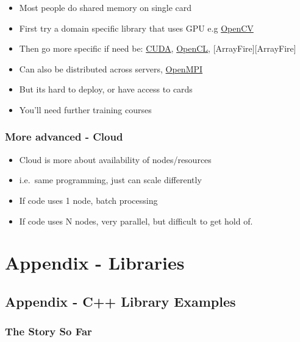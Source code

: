 \begin{itemize}
\itemsep1pt\parskip0pt
\item
  Most people do shared memory on single card
\item
  First try a domain specific library that uses GPU e.g
  \href{https://opencv.org/}{OpenCV}
\item
  Then go more specific if need be:
  \href{https://www.nvidia.com/object/cuda_home_temp.html}{CUDA},
  \href{https://www.khronos.org/opencl/}{OpenCL},
  {[}ArrayFire{]}{[}ArrayFire{]}
\item
  Can also be distributed across servers,
  \href{https://www.open-mpi.org/}{OpenMPI}
\item
  But its hard to deploy, or have access to cards
\item
  You'll need further training courses
\end{itemize}

\subsubsection{More advanced - Cloud}\label{more-advanced---cloud}

\begin{itemize}
\itemsep1pt\parskip0pt
\item
  Cloud is more about availability of nodes/resources
\item
  i.e.~same programming, just can scale differently
\item
  If code uses 1 node, batch processing
\item
  If code uses N nodes, very parallel, but difficult to get hold of.
\end{itemize}

\section{Appendix - Libraries}\label{appendix---libraries}

\subsection{Appendix - C++ Library
Examples}\label{appendix---c-library-examples}

\subsubsection{The Story So Far}\label{the-story-so-far-2}


